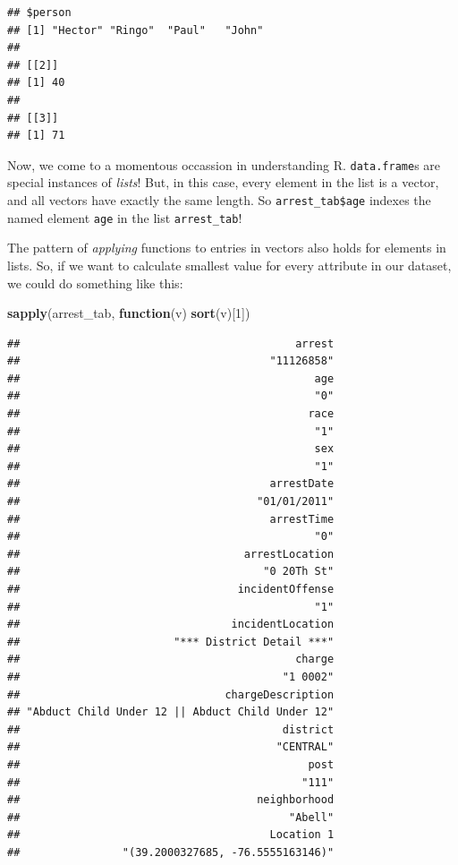 \documentclass[]{book}
\newenvironment{Shaded}{\begin{snugshade}}{\end{snugshade}}
\newcommand{\KeywordTok}[1]{\textcolor[rgb]{0.13,0.29,0.53}{\textbf{#1}}}
\newcommand{\DecValTok}[1]{\textcolor[rgb]{0.00,0.00,0.81}{#1}}
\newcommand{\ControlFlowTok}[1]{\textcolor[rgb]{0.13,0.29,0.53}{\textbf{#1}}}
\newcommand{\NormalTok}[1]{#1}
\theoremstyle{definition}
\theoremstyle{definition}
\theoremstyle{remark}
\begin{document}
\begin{verbatim}
## $person
## [1] "Hector" "Ringo"  "Paul"   "John"  
## 
## [[2]]
## [1] 40
## 
## [[3]]
## [1] 71
\end{verbatim}

Now, we come to a momentous occassion in understanding R.
\texttt{data.frame}s are special instances of \emph{lists}! But, in this
case, every element in the list is a vector, and all vectors have
exactly the same length. So \texttt{arrest\_tab\$age} indexes the named
element \texttt{age} in the list \texttt{arrest\_tab}!

The pattern of \emph{applying} functions to entries in vectors also
holds for elements in lists. So, if we want to calculate smallest value
for every attribute in our dataset, we could do something like this:

\begin{Shaded}
\begin{Highlighting}[]
\KeywordTok{sapply}\NormalTok{(arrest_tab, }\ControlFlowTok{function}\NormalTok{(v) }\KeywordTok{sort}\NormalTok{(v)[}\DecValTok{1}\NormalTok{])}
\end{Highlighting}
\end{Shaded}

\begin{verbatim}
##                                           arrest 
##                                       "11126858" 
##                                              age 
##                                              "0" 
##                                             race 
##                                              "1" 
##                                              sex 
##                                              "1" 
##                                       arrestDate 
##                                     "01/01/2011" 
##                                       arrestTime 
##                                              "0" 
##                                   arrestLocation 
##                                      "0 20Th St" 
##                                  incidentOffense 
##                                              "1" 
##                                 incidentLocation 
##                        "*** District Detail ***" 
##                                           charge 
##                                         "1 0002" 
##                                chargeDescription 
## "Abduct Child Under 12 || Abduct Child Under 12" 
##                                         district 
##                                        "CENTRAL" 
##                                             post 
##                                            "111" 
##                                     neighborhood 
##                                          "Abell" 
##                                       Location 1 
##                "(39.2000327685, -76.5555163146)"
\end{verbatim}
\end{document}
